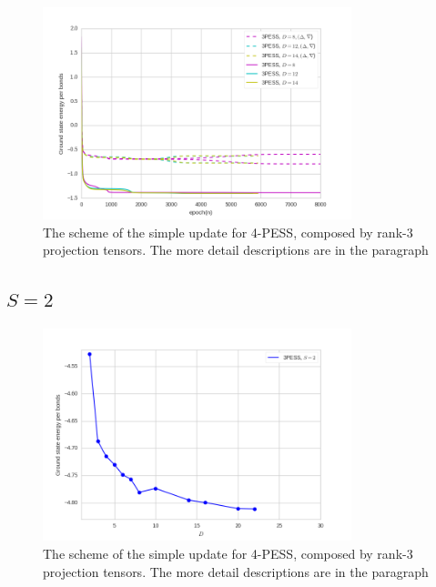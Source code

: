 \begin{figure}[ht]
	\centering
	\includegraphics[width=0.80\textwidth]{figures/3pess_GEN.png}
	\caption[The scheme of the simple update for 4-PESS, composed by rank-3 projection tensors.]{The scheme of the simple update for 4-PESS, composed by rank-3 projection tensors. The more detail descriptions are in the paragraph}
	\label{fig4329}
\end{figure}

\subsection{$S=2$}

\begin{figure}[ht]
	\centering
	\includegraphics[width=0.80\textwidth]{figures/3pess_S2GE.png}
	\caption[The scheme of the simple update for 4-PESS, composed by rank-3 projection tensors.]{The scheme of the simple update for 4-PESS, composed by rank-3 projection tensors. The more detail descriptions are in the paragraph}
	\label{fig4330}
\end{figure}

